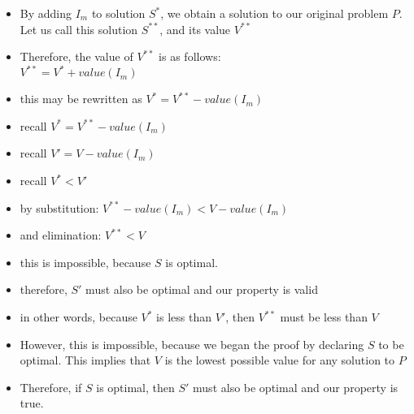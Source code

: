 \documentclass[landscape]{slides}
\begin{document}
\begin{slide} %
	\begin{itemize}
		\item By adding $I_m$ to solution $S^*$, we obtain a solution to our
		original problem $P$. Let us call this solution $S^{**}$, and its value
		$V^{**}$
		\item Therefore, the value of $V^{**}$ is as follows: 
		\\$V^{**} = V^* + value(I_m)$
		\item this may be rewritten as $V^* = V^{**} - value(I_m)$
	\end{itemize}
\end{slide}

\begin{slide} %
	\begin{itemize}
		\item recall $V^* = V^{**} - value(I_m)$
		\item recall $V' = V - value(I_m)$ 
		\item recall $V^* < V'$
		\item by substitution: $V^{**} - value(I_m) < V - value(I_m)$
		\item and elimination: $V^{**} < V$
		\item this is impossible, because $S$ is optimal. 
		\item therefore, $S'$ must also be optimal and our property is valid
	\end{itemize}
\end{slide}

\begin{slide} %
	\begin{itemize}
		\item in other words, because $V^*$ is less than $V'$, then $V^{**}$ must
		be less than $V$
		\item However, this is impossible, because we began the proof by declaring
		$S$ to be optimal. This implies that $V$ is the lowest possible value for
		any solution to $P$
		\item Therefore, if $S$ is optimal, then $S'$ must also be optimal and our
		property is true.
	\end{itemize}
\end{slide}
\end{document}
